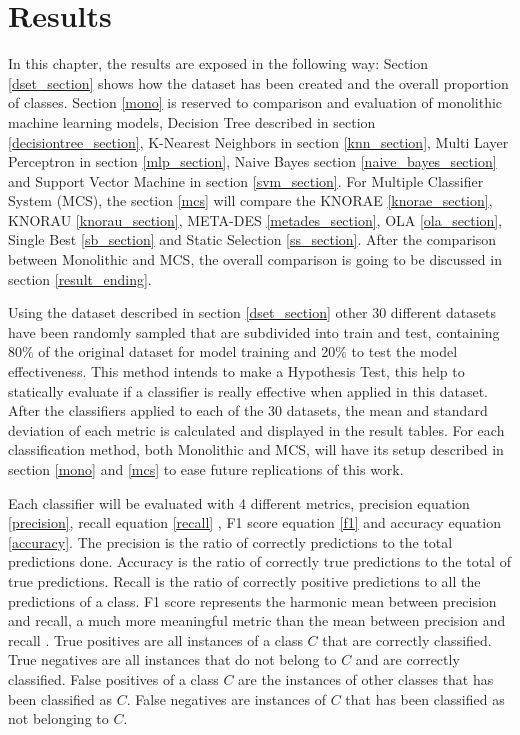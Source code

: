 \chapter{Results}

In this chapter, the results are exposed in the following way: Section \ref{dset_section} shows how the dataset has been created and the overall proportion of classes. Section \ref{mono} is reserved to comparison and evaluation of monolithic machine learning models, Decision Tree described in section \ref{decisiontree_section}, K-Nearest Neighbors in section \ref{knn_section}, Multi Layer Perceptron in section \ref{mlp_section}, Naive Bayes section \ref{naive_bayes_section} and Support Vector Machine in section \ref{svm_section}. For Multiple Classifier System (MCS), the section \ref{mcs} will compare the KNORAE \ref{knorae_section}, KNORAU \ref{knorau_section}, META-DES \ref{metades_section}, OLA \ref{ola_section}, Single Best \ref{sb_section} and Static Selection \ref{ss_section}. After the comparison between Monolithic and MCS, the overall comparison is going to be discussed in section \ref{result_ending}.

Using the dataset described in section \ref{dset_section} other 30 different datasets have been randomly sampled that are subdivided into train and test, containing 80\% of the original dataset for model training and 20\% to test the model effectiveness. This method intends to make a Hypothesis Test, this help to statically evaluate if a classifier is really effective when applied in this dataset. After the classifiers applied to each of the 30 datasets, the mean and standard deviation of each metric is calculated and displayed in the result tables. For each classification method, both Monolithic and MCS, will have its setup described in section \ref{mono} and \ref{mcs} to ease future replications of this work. 

Each classifier will be evaluated with 4 different metrics, precision equation \ref{precision}, recall equation \ref{recall} , F1 score equation \ref{f1} and accuracy equation \ref{accuracy}. The precision is the ratio of correctly predictions to the total predictions done. Accuracy is the ratio of correctly true predictions to the total of true predictions. Recall is the ratio of correctly positive predictions to all the predictions of a class. F1 score represents the harmonic mean between precision and recall, a much more meaningful metric than the mean between precision and recall \cite{sasaki2007truth}. True positives are all instances of a class $C$ that are correctly classified. True negatives are all instances that do not belong to $C$ and are correctly classified. False positives of a class $C$ are the instances of other classes that has been classified as $C$. False negatives are instances of $C$ that has been classified as not belonging to $C$.

